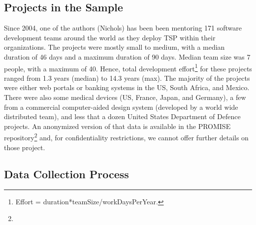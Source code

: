 \subsection{Projects in the Sample}
Since 2004, one of the authors (Nichols) has been been mentoring 171 software development teams around the world as they deploy TSP within their organizations.  
The projects
were mostly small to medium, with a median duration of 46 days
and a maximum duration of 90 days. Median team size was 7
people, with a maximum of 40. Hence,  total development 
effort\footnote{
Effort =  duration*teamSize/workDaysPerYear.} for
these projects ranged from 1.3 years (median) to 14.3 years (max).
The majority of
the projects were either web portals or banking systems in the US, South Africa, and Mexico. 
There were also some  medical devices (US, France, Japan, and Germany),  a few from a commercial 
computer-aided design system (developed by a world wide distributed team), and less that  
a dozen United States
Department of Defence projects.
 An anonymized version of that data is available in the PROMISE repository\footnote{} and,
 for confidentiality restrictions, we cannot offer 
further details
on those project.  


\subsection{Data Collection Process}

